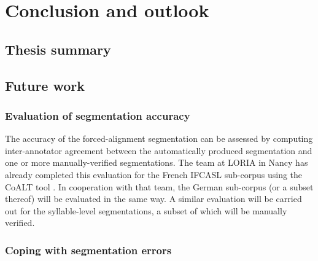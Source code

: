 %
%
\chapter{Conclusion and outlook}
\label{chap:conclusion}


\section{Thesis summary}
 \label{sec:conclusion:summary}

\section{Future work}
\label{sec:conclusion:future}


	\subsection{Evaluation of segmentation accuracy}
	
		\TODO{}

The accuracy of the forced-alignment segmentation can be assessed by computing inter-annotator agreement between the automatically produced segmentation and one or more manually-verified segmentations. The team at LORIA in Nancy has already completed this evaluation for the French IFCASL sub-corpus using the CoALT tool \citep{Fohr2012}. In cooperation with that team, the German sub-corpus (or a subset thereof) will be evaluated in the same way.
	A similar evaluation will be carried out for the syllable-level segmentations, a subset of which will be manually verified.


	\subsection{Coping with segmentation errors}

